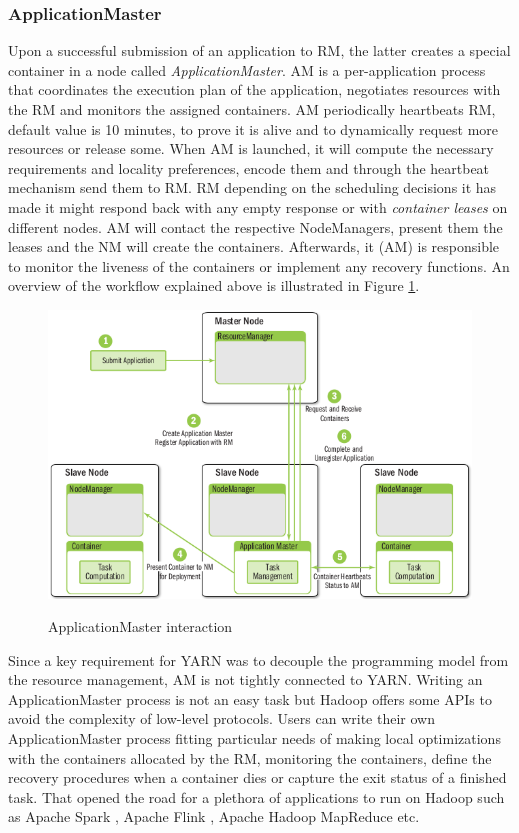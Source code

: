\subsubsection{ApplicationMaster}
\label{sssec:am}
Upon a successful submission of an application to RM, the latter
creates a special container in a node called
\emph{ApplicationMaster}. AM is a per-application process that
coordinates the execution plan of the application, negotiates
resources with the RM and monitors the assigned containers. AM
periodically heartbeats RM, default value is 10 minutes, to prove it
is alive and to dynamically request more resources or release
some. When AM is launched, it will compute the necessary requirements
and locality preferences, encode them and through the heartbeat
mechanism send them to RM. RM depending on the scheduling decisions it
has made it might respond back with any empty response or with
\emph{container leases} on different nodes. AM will contact the
respective NodeManagers, present them the leases and the NM will
create the containers. Afterwards, it (AM) is responsible to monitor the liveness
of the containers or implement any recovery functions. An overview of
the workflow explained above is illustrated in Figure \ref{fig:yarn_am_rm_interaction}.

\begin{figure}
\centering
\includegraphics[scale=0.6]{resources/images/Background/AM_RM_interaction.png}
\label{fig:yarn_am_rm_interaction}
\caption{ApplicationMaster interaction \cite{Murthy:2014:AHY:2636998}}
\end{figure}

Since a key requirement for YARN was to decouple the programming model
from the resource management, AM is not tightly connected to YARN.
Writing an ApplicationMaster process is not an easy task but Hadoop
offers some APIs to avoid the complexity of low-level protocols.
Users can write their own ApplicationMaster
process fitting particular needs of making local optimizations with
the containers allocated by the RM, monitoring the containers,
define the recovery procedures when a container dies or capture the
exit status of a finished task. That opened the road for a plethora
of applications to run on Hadoop such as Apache Spark
\cite{apache_spark}, Apache Flink \cite{apache_flink}, Apache Hadoop
MapReduce \cite{apache_hadoop} etc.

